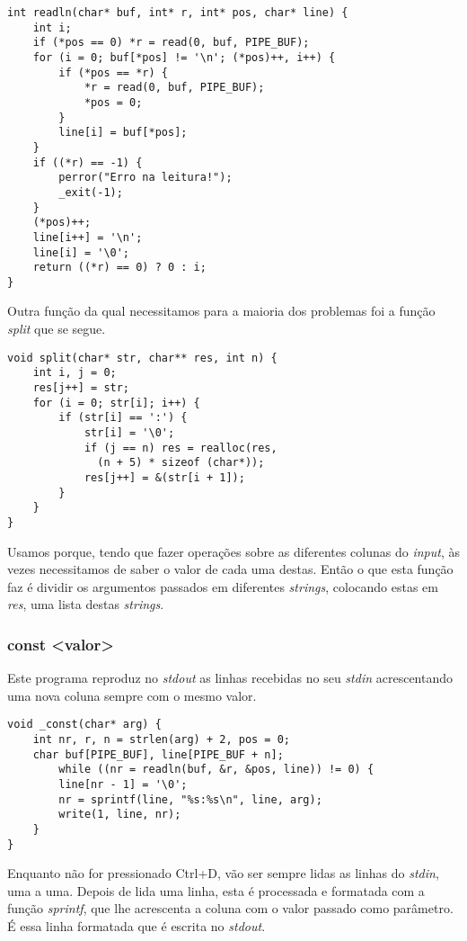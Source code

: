 \documentclass[a4paper]{article}
\begin{document}
\begin{Verbatim}[obeytabs]
int readln(char* buf, int* r, int* pos, char* line) {
	int i;
	if (*pos == 0) *r = read(0, buf, PIPE_BUF);
	for (i = 0; buf[*pos] != '\n'; (*pos)++, i++) {
		if (*pos == *r) {
			*r = read(0, buf, PIPE_BUF);
			*pos = 0;
		}
		line[i] = buf[*pos];
	}
	if ((*r) == -1) {
		perror("Erro na leitura!");
		_exit(-1);
	}
	(*pos)++;
	line[i++] = '\n';
	line[i] = '\0';
	return ((*r) == 0) ? 0 : i;
}
\end{Verbatim}

Outra função da qual necessitamos para a maioria dos problemas foi a função \textit{split} que se segue.

\begin{Verbatim}[obeytabs]
void split(char* str, char** res, int n) {
	int i, j = 0;
	res[j++] = str;
	for (i = 0; str[i]; i++) {
		if (str[i] == ':') {
			str[i] = '\0';
			if (j == n) res = realloc(res,
			  (n + 5) * sizeof (char*));
			res[j++] = &(str[i + 1]);
		}
	}
}
\end{Verbatim}

Usamos porque, tendo que fazer operações sobre as diferentes colunas do \textit{input}, às vezes necessitamos de saber o valor de cada uma destas. Então o que esta função faz é dividir os argumentos passados em diferentes \textit{strings}, colocando estas em \textit{res}, uma lista destas \textit{strings}.

\subsubsection{const \textless valor\textgreater}

Este programa reproduz no \textit{stdout} as linhas recebidas no seu \textit{stdin} acrescentando uma nova coluna sempre com o mesmo valor.

\begin{Verbatim}[obeytabs]
void _const(char* arg) {
	int nr, r, n = strlen(arg) + 2, pos = 0;
	char buf[PIPE_BUF], line[PIPE_BUF + n];
		while ((nr = readln(buf, &r, &pos, line)) != 0) {
		line[nr - 1] = '\0';
		nr = sprintf(line, "%s:%s\n", line, arg);
		write(1, line, nr);
	}
}
\end{Verbatim}

Enquanto não for pressionado Ctrl+D, vão ser sempre lidas as linhas do \textit{stdin}, uma a uma. Depois de lida uma linha, esta é processada e formatada com a função \textit{sprintf}, que lhe acrescenta a coluna com o valor passado como parâmetro. É essa linha formatada que é escrita no \textit{stdout}.
\end{document}
